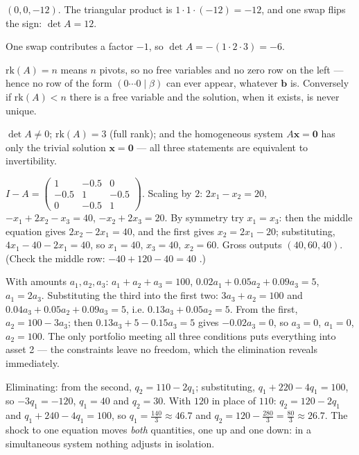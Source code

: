 \begin{solutions}
        $(0,0,-12)$. The triangular product is $1\cdot1\cdot(-12)=-12$,
        and one swap flips the sign: $\det A=12$.
  \item One swap contributes a factor $-1$, so
        $\det A=-(1\cdot2\cdot3)=-6$.
  \item $\mathrm{rk}(A)=n$ means $n$ pivots, so no free variables and no
        zero row on the left --- hence no row of the form
        $(0\cdots0\mid\beta)$ can ever appear, whatever $\mathbf{b}$ is.
        Conversely if $\mathrm{rk}(A)<n$ there is a free variable and the
        solution, when it exists, is never unique.
  \item $\det A\neq0$; $\mathrm{rk}(A)=3$ (full rank); and the homogeneous
        system $A\mathbf{x}=\mathbf{0}$ has only the trivial solution
        $\mathbf{x}=\mathbf{0}$ --- all three statements are equivalent to
        invertibility.
  \item $I-A=\begin{pmatrix}1&-0.5&0\\-0.5&1&-0.5\\0&-0.5&1\end{pmatrix}$.
        Scaling by $2$: $2x_{1}-x_{2}=20$, $-x_{1}+2x_{2}-x_{3}=40$,
        $-x_{2}+2x_{3}=20$. By symmetry try $x_{1}=x_{3}$: then the middle
        equation gives $2x_{2}-2x_{1}=40$, and the first gives
        $x_{2}=2x_{1}-20$; substituting, $4x_{1}-40-2x_{1}=40$, so
        $x_{1}=40$, $x_{3}=40$, $x_{2}=60$. Gross outputs $(40,60,40)$.
        (Check the middle row: $-40+120-40=40$ \checkmark.)
  \item With amounts $a_{1},a_{2},a_{3}$:
        $a_{1}+a_{2}+a_{3}=100$, \;$0.02a_{1}+0.05a_{2}+0.09a_{3}=5$,
        \;$a_{1}=2a_{3}$. Substituting the third into the first two:
        $3a_{3}+a_{2}=100$ and $0.04a_{3}+0.05a_{2}+0.09a_{3}=5$, i.e.
        $0.13a_{3}+0.05a_{2}=5$. From the first, $a_{2}=100-3a_{3}$; then
        $0.13a_{3}+5-0.15a_{3}=5$ gives $-0.02a_{3}=0$, so $a_{3}=0$,
        $a_{1}=0$, $a_{2}=100$. The only portfolio meeting all three
        conditions puts everything into asset 2 --- the constraints leave no
        freedom, which the elimination reveals immediately.
  \item Eliminating: from the second, $q_{2}=110-2q_{1}$; substituting,
        $q_{1}+220-4q_{1}=100$, so $-3q_{1}=-120$, $q_{1}=40$ and
        $q_{2}=30$. With $120$ in place of $110$: $q_{2}=120-2q_{1}$ and
        $q_{1}+240-4q_{1}=100$, so $q_{1}=\tfrac{140}{3}\approx46.7$ and
        $q_{2}=120-\tfrac{280}{3}=\tfrac{80}{3}\approx26.7$. The shock to
        one equation moves \emph{both} quantities, one up and one down:
        in a simultaneous system nothing adjusts in isolation.
\end{solutions}
